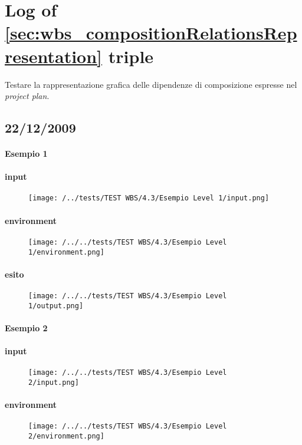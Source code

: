 \section{Log of \ref{sec:wbs_compositionRelationsRepresentation} triple}

Testare la rappresentazione grafica delle dipendenze di composizione espresse
nel \emph{project plan}.

\subsection{22/12/2009}
\paragraph{Esempio 1}
\paragraph{input}

\begin{figure}
\centering
\texttt{[image: /../tests/TEST WBS/4.3/Esempio Level 1/input.png]}
\end{figure}

\paragraph{environment}
\begin{figure}
\centering
\texttt{[image: /../../tests/TEST WBS/4.3/Esempio Level 1/environment.png]}
\end{figure}
\paragraph{esito}
\begin{figure}
\centering
\texttt{[image: /../../tests/TEST WBS/4.3/Esempio Level 1/output.png]}
\end{figure}

\paragraph{Esempio 2}
\paragraph{input}
\begin{figure}
\centering
\texttt{[image: /../../tests/TEST WBS/4.3/Esempio Level 2/input.png]}
\end{figure}
\paragraph{environment}
\begin{figure}
\centering
\texttt{[image: /../../tests/TEST WBS/4.3/Esempio Level 2/environment.png]}
\end{figure}
